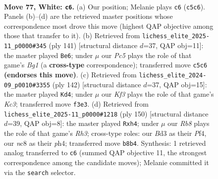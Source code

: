 \documentclass[11pt]{article}
\begin{document}
\clearpage

\begin{figure}[p]\centering
\begin{subfigure}{0.46\textwidth}\centering
\resizebox{\linewidth}{!}{%
\newchessgame
\chessboard[
  setfen={1Rnk4/6r1/P7/2P4p/8/2pB1KPP/2P5/8 w - - 3 77},
  showmover=false,
  pgfstyle=straightmove, color=movearrow, markmove={c5-c6}
]}
\caption{}
\end{subfigure}\hfill
\begin{subfigure}{0.46\textwidth}\centering
\resizebox{\linewidth}{!}{%
\newchessgame
\chessboard[
  setfen={1r4b1/3P4/1N1k2p1/7p/3K3P/6P1/p7/2R5 b - - 19 71},
  showmover=false,
  pgfstyle=straightmove, color=movearrow, markmove={g8-e6}
]}
\caption{}
\end{subfigure}
\\[4pt]
\begin{subfigure}{0.46\textwidth}\centering
\resizebox{\linewidth}{!}{%
\newchessgame
\chessboard[
  setfen={2r5/8/4k3/p3n2p/P6P/1PK1R1P1/8/8 w - - 4 72},
  showmover=false,
  pgfstyle=straightmove, color=movearrow, markmove={c3-d4}
]}
\caption{}
\end{subfigure}\hfill
\begin{subfigure}{0.46\textwidth}\centering
\resizebox{\linewidth}{!}{%
\newchessgame
\chessboard[
  setfen={2r5/8/5k2/1p1P4/p2K1P1p/2P4R/P7/8 w - - 2 76},
  showmover=false,
  pgfstyle=straightmove, color=movearrow, markmove={h3-h4}
]}
\caption{}
\end{subfigure}
\caption{\textbf{Move 77, White: \texttt{c6}.} (a) Our position; Melanie plays \texttt{c6} (\texttt{c5c6}). Panels (b)--(d) are the retrieved master positions whose correspondence most drove this move (highest QAP objective among those that transfer to it). (b) Retrieved from \texttt{lichess\_elite\_2025-11\_p0000\#345} (ply 141) [structural distance $d$=37, QAP obj=11]: the master played \texttt{Be6}; under $\mu$ our \emph{Pc5} plays the role of that game's \emph{Bg1} (a \textbf{cross-type} correspondence); transferred move \texttt{c5c6} \textbf{(endorses this move)}. (c) Retrieved from \texttt{lichess\_elite\_2024-09\_p0010\#3355} (ply 142) [structural distance $d$=37, QAP obj=15]: the master played \texttt{Kd4}; under $\mu$ our \emph{Kf3} plays the role of that game's \emph{Kc3}; transferred move \texttt{f3e3}. (d) Retrieved from \texttt{lichess\_elite\_2025-11\_p0000\#1218} (ply 150) [structural distance $d$=39, QAP obj=8]: the master played \texttt{Rxh4}; under $\mu$ our \emph{Rb8} plays the role of that game's \emph{Rh3}; cross-type roles: our \emph{B}d3 as their \emph{P}f4, our \emph{n}c8 as their \emph{p}h4; transferred move \texttt{b8b4}. Synthesis: 1 retrieved analog transferred to \texttt{c6} (summed QAP objective 11, the strongest correspondence among the candidate moves); Melanie committed it via the \texttt{search} selector.}
\label{fig:thought-m152}
\end{figure}
\end{document}
